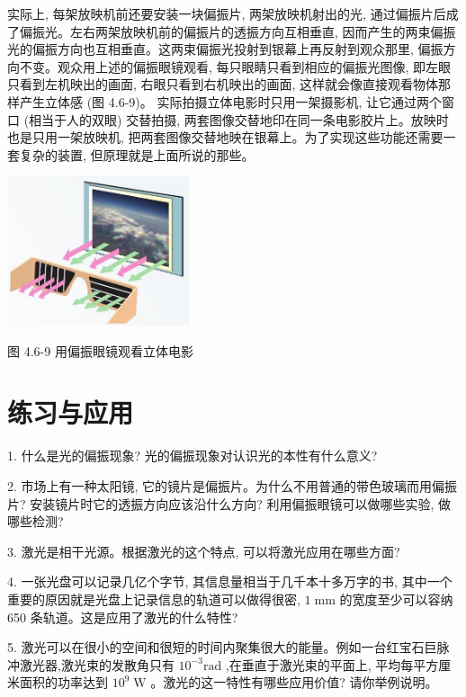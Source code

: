 \documentclass[10pt]{article}
\begin{document}
实际上, 每架放映机前还要安装一块偏振片, 两架放映机射出的光, 通过偏振片后成了偏振光。左右两架放映机前的偏振片的透振方向互相垂直, 因而产生的两束偏振光的偏振方向也互相垂直。这两束偏振光投射到银幕上再反射到观众那里, 偏振方向不变。观众用上述的偏振眼镜观看, 每只眼睛只看到相应的偏振光图像, 即左眼只看到左机映出的画面, 右眼只看到右机映出的画面, 这样就会像直接观看物体那样产生立体感 (图 4.6-9)。 实际拍摄立体电影时只用一架摄影机, 让它通过两个窗口 (相当于人的双眼) 交替拍摄, 两套图像交替地印在同一条电影胶片上。放映时也是只用一架放映机, 把两套图像交替地映在银幕上。为了实现这些功能还需要一套复杂的装置, 但原理就是上面所说的那些。

\begin{center}
\includegraphics[max width=0.4\textwidth]{images/01910e4c-ebb8-7d2c-8f2f-2375bc1d2d12_118_209345.jpg}
\end{center}

图 4.6-9 用偏振眼镜观看立体电影

\section*{练习与应用}

1. 什么是光的偏振现象? 光的偏振现象对认识光的本性有什么意义?

2. 市场上有一种太阳镜, 它的镜片是偏振片。为什么不用普通的带色玻璃而用偏振片? 安装镜片时它的透振方向应该沿什么方向? 利用偏振眼镜可以做哪些实验, 做哪些检测?

3. 激光是相干光源。根据激光的这个特点, 可以将激光应用在哪些方面?

4. 一张光盘可以记录几亿个字节, 其信息量相当于几千本十多万字的书, 其中一个重要的原因就是光盘上记录信息的轨道可以做得很密, \(1\mathrm{\;{mm}}\) 的宽度至少可以容纳 650 条轨道。这是应用了激光的什么特性?

5. 激光可以在很小的空间和很短的时间内聚集很大的能量。例如一台红宝石巨脉冲激光器,激光束的发散角只有 \({10}^{-3}\mathrm{{rad}}\) ,在垂直于激光束的平面上, 平均每平方厘米面积的功率达到 \({10}^{9}\mathrm{\;W}\) 。激光的这一特性有哪些应用价值? 请你举例说明。
\end{document}
